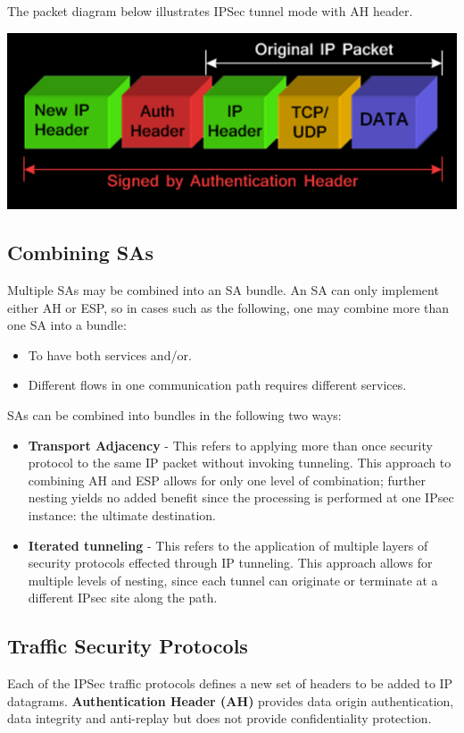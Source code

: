 \documentclass{article}
\begin{document}
The packet diagram below illustrates IPSec tunnel mode with AH header.
\begin{center}
  \includegraphics[scale=0.6]{ipsec-tunnel-ah.png}
\end{center}

\subsection{Combining SAs}
Multiple SAs may be combined into an SA bundle. An SA can only implement either AH or ESP, so in cases such as the following, one may combine more than one SA into a bundle:
\begin{itemize}
  \item To have both services and/or.
  \item Different flows in one communication path requires different services.
\end{itemize}
SAs can be combined into bundles in the following two ways:
\begin{itemize}
  \item \textbf{Transport Adjacency} - This refers to applying more than once security protocol to the same IP packet without invoking tunneling. This approach to combining AH and ESP allows for only one level of combination; further nesting yields no added benefit since the processing is performed at one IPsec instance: the ultimate destination.
  \item \textbf{Iterated tunneling} - This refers to the application of multiple layers of security protocols effected through IP tunneling. This approach allows for multiple levels of nesting, since each tunnel can originate or terminate at a different IPsec site along the path.
\end{itemize}

\subsection{Traffic Security Protocols}
Each of the IPSec traffic protocols defines a new set of headers to be added to IP datagrams. \textbf{Authentication Header (AH)} provides data origin authentication, data integrity and anti-replay but does not provide confidentiality protection.
\end{document}
